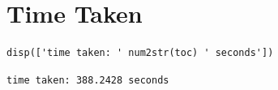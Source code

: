 \section{Time Taken}

\color{RoyalPurple}\begin{verbatim}
disp(['time taken: ' num2str(toc) ' seconds'])
\end{verbatim}
\color{black}

        \begin{verbatim}time taken: 388.2428 seconds
\end{verbatim}
\color{black}
   